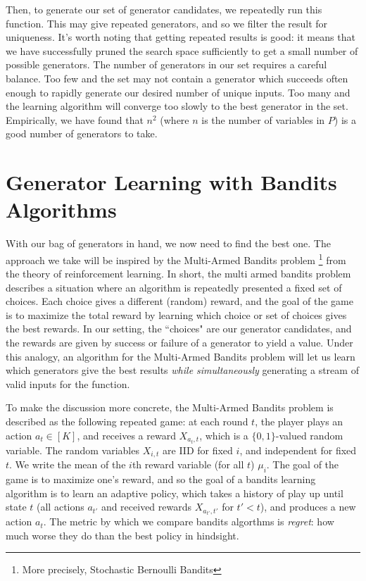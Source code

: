 \documentclass[sigconf,nonacm]{acmart}
\begin{document}
Then, to generate our set of generator candidates, we repeatedly run this function. This may give repeated generators, and so we filter the result for uniqueness. It's worth noting that getting repeated results is good: it means that we have successfully pruned the search space sufficiently to get a small number of possible generators. The number of generators in our set requires a careful balance. Too few and the set may not contain a generator which succeeds often enough to rapidly generate our desired number of unique inputs. Too many and the learning algorithm will converge too slowly to the best generator in the set. Empirically, we have found that $n^2$ (where $n$ is the number of variables in $P$) is a good number of generators to take.

\section{Generator Learning with Bandits Algorithms}
\label{sec:bandits}
With our bag of generators in hand, we now need to find the best one. The approach we take will be inspired by the Multi-Armed Bandits \cite{gittins1979bandit} problem \footnote{More precisely, Stochastic Bernoulli Bandits} from the theory of reinforcement learning. In short, the multi armed bandits problem describes a situation where an algorithm is repeatedly presented a fixed set of choices. Each choice gives a different (random) reward, and the goal of the game is to maximize the total reward by learning which choice or set of choices gives the best rewards. In our setting, the ``choices" are our generator candidates, and the rewards are given by success or failure of a generator to yield a value. Under this analogy, an algorithm for the Multi-Armed Bandits problem will let us learn which generators give the best results \textit{while simultaneously} generating a stream of valid inputs for the function.

To make the discussion more concrete, the Multi-Armed Bandits problem is described as the following repeated game: at each round $t$, the player plays an action $a_t \in [K]$, and receives a reward $X_{{a_t},t}$, which is a $\{0,1\}$-valued random variable. The random variables $X_{i,t}$ are IID for fixed $i$, and independent for fixed $t$. We write the mean of the $i$th reward variable (for all $t$) $\mu_i$. The goal of the game is to maximize one's reward, and so the goal of a bandits learning algorithm is to learn an adaptive policy, which takes a history of play up until state $t$ (all actions $a_{t'}$ and received rewards $X_{a_{t'},t'}$ for $t' < t$), and produces a new action $a_t$. The metric by which we compare bandits algorthms is \textit{regret}: how much worse they do than the best policy in hindsight.
\end{document}
